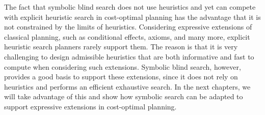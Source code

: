The fact that symbolic blind search does not use heuristics and yet can compete with explicit heuristic search in cost-optimal planning \autocite{edelkamp-et-al-aaai2015,torralba-et-al-aij2017,speck-et-al-icaps2020} has the advantage that it is not constrained by the limits of heuristics.
Considering expressive extensions of classical planning, such as conditional effects, axioms, and many more, explicit heuristic search planners rarely support them.
The reason is that it is very challenging to design admissible heuristics that are both informative and fast to compute when considering such extensions.
Symbolic blind search, however, provides a good basis to support these extensions, since it does not rely on heuristics and performs an efficient exhaustive search.
In the next chapters, we will take advantage of this and show how symbolic search can be adapted to support expressive extensions in cost-optimal planning.
